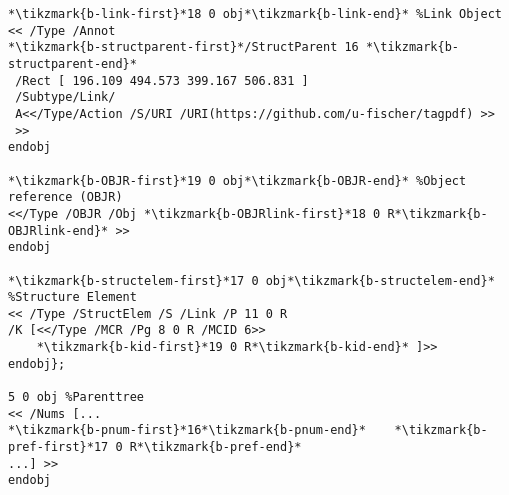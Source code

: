 \documentclass{scrartcl}
\begin{document}
\begin{lstlisting}[name=OBJR]
*\tikzmark{b-link-first}*18 0 obj*\tikzmark{b-link-end}* %Link Object
<< /Type /Annot
*\tikzmark{b-structparent-first}*/StructParent 16 *\tikzmark{b-structparent-end}*
 /Rect [ 196.109 494.573 399.167 506.831 ]
 /Subtype/Link/
 A<</Type/Action /S/URI /URI(https://github.com/u-fischer/tagpdf) >>
 >>
endobj

*\tikzmark{b-OBJR-first}*19 0 obj*\tikzmark{b-OBJR-end}* %Object reference (OBJR)
<</Type /OBJR /Obj *\tikzmark{b-OBJRlink-first}*18 0 R*\tikzmark{b-OBJRlink-end}* >>
endobj

*\tikzmark{b-structelem-first}*17 0 obj*\tikzmark{b-structelem-end}* %Structure Element
<< /Type /StructElem /S /Link /P 11 0 R
/K [<</Type /MCR /Pg 8 0 R /MCID 6>>
    *\tikzmark{b-kid-first}*19 0 R*\tikzmark{b-kid-end}* ]>>
endobj};

5 0 obj %Parenttree
<< /Nums [...
*\tikzmark{b-pnum-first}*16*\tikzmark{b-pnum-end}*    *\tikzmark{b-pref-first}*17 0 R*\tikzmark{b-pref-end}*
...] >>
endobj
\end{lstlisting}
\NewDocumentCommand{}

\end{document}
